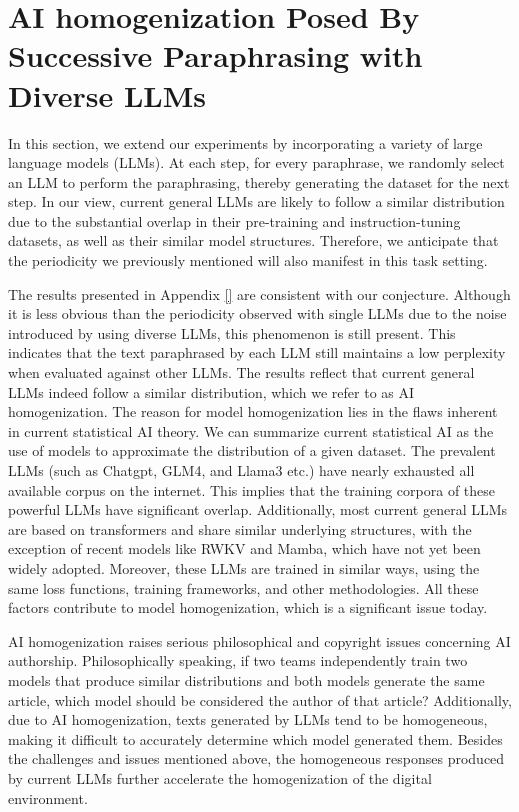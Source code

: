 
\section{AI homogenization Posed By Successive Paraphrasing with Diverse LLMs}
\label{SPwithDiverseModel}
In this section, we extend our experiments by incorporating a variety of large language models (LLMs). At each step, for every paraphrase, we randomly select an LLM to perform the paraphrasing, thereby generating the dataset for the next step.
In our view, current general LLMs are likely to follow a similar distribution due to the substantial overlap in their pre-training and instruction-tuning datasets, as well as their similar model structures.
Therefore, we anticipate that the periodicity we previously mentioned will also manifest in this task setting.

The results presented in Appendix \ref{} are consistent with our conjecture.
Although it is less obvious than the periodicity observed with single LLMs due to the noise introduced by using diverse LLMs, this phenomenon is still present.
This indicates that the text paraphrased by each LLM still maintains a low perplexity when evaluated against other LLMs.
The results reflect that current general LLMs indeed follow a similar distribution, which we refer to as AI homogenization.
The reason for model homogenization lies in the flaws inherent in current statistical AI theory.
We can summarize current statistical AI as the use of models to approximate the distribution of a given dataset.
The prevalent LLMs (such as Chatgpt, GLM4, and Llama3 etc.) have nearly exhausted all available corpus on the internet.
This implies that the training corpora of these powerful LLMs have significant overlap.
Additionally, most current general LLMs are based on transformers and share similar underlying structures, with the exception of recent models like RWKV and Mamba, which have not yet been widely adopted.
Moreover, these LLMs are trained in similar ways, using the same loss functions, training frameworks, and other methodologies.
All these factors contribute to model homogenization, which is a significant issue today. 

AI homogenization raises serious philosophical and copyright issues concerning AI authorship.
Philosophically speaking, if two teams independently train two models that produce similar distributions and both models generate the same article, which model should be considered the author of that article?
Additionally, due to AI homogenization, texts generated by LLMs tend to be homogeneous, making it difficult to accurately determine which model generated them.
Besides the challenges and issues mentioned above, the homogeneous responses produced by current LLMs further accelerate the homogenization of the digital environment.





